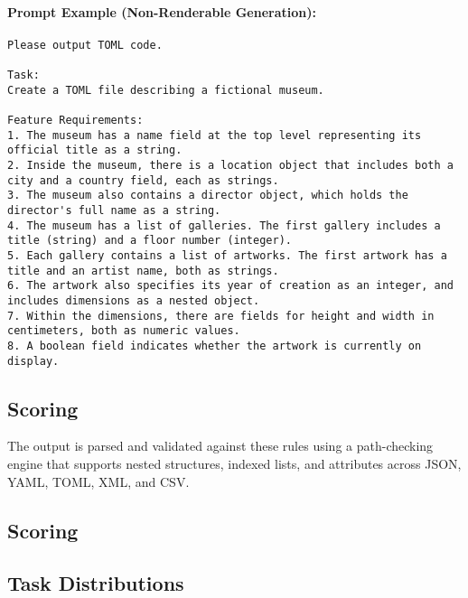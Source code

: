 \paragraph{Prompt Example (Non-Renderable Generation):}
\begin{lstlisting}[breaklines=true, basicstyle=\ttfamily\small]
Please output TOML code.

Task:
Create a TOML file describing a fictional museum.

Feature Requirements:
1. The museum has a name field at the top level representing its official title as a string.
2. Inside the museum, there is a location object that includes both a city and a country field, each as strings.
3. The museum also contains a director object, which holds the director's full name as a string.
4. The museum has a list of galleries. The first gallery includes a title (string) and a floor number (integer).
5. Each gallery contains a list of artworks. The first artwork has a title and an artist name, both as strings.
6. The artwork also specifies its year of creation as an integer, and includes dimensions as a nested object.
7. Within the dimensions, there are fields for height and width in centimeters, both as numeric values.
8. A boolean field indicates whether the artwork is currently on display.
\end{lstlisting}


\subsection{Scoring}



The output is parsed and validated against these rules using a path-checking engine that supports nested structures, indexed lists, and attributes across JSON, YAML, TOML, XML, and CSV.

\subsection{Scoring}






\subsection{Task Distributions}

